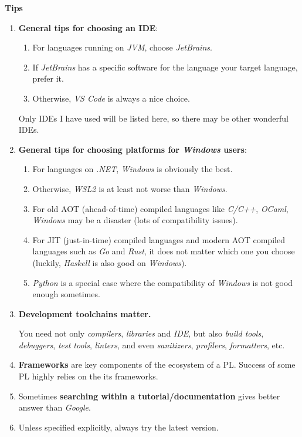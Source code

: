 \documentclass{article}
\begin{document}
\textbf{Tips}
\begin{enumerate}
    \item \textbf{General tips for choosing an IDE}:
    \begin{enumerate}
        \item For languages running on \emph{JVM}, choose \emph{JetBrains}.
        \item If \emph{JetBrains} has a specific software for the language your target language, prefer it.
        \item Otherwise, \emph{VS Code} is always a nice choice.
    \end{enumerate}
        Only IDEs I have used will be listed here, so there may be other wonderful IDEs.
    \item \textbf{General tips for choosing platforms for \emph{Windows} users}:
    \begin{enumerate}
        \item For languages on \emph{.NET}, \emph{Windows} is obviously the best.
        \item Otherwise, \emph{WSL2} is at least not worse than \emph{Windows}.
        \item For old AOT (ahead-of-time) compiled languages like \emph{C/C++}, \emph{OCaml}, \emph{Windows} may be a disaster (lots of compatibility issues).
        \item For JIT (just-in-time) compiled languages and modern AOT compiled languages such as \emph{Go} and \emph{Rust}, it does not matter which one you choose (luckily, \emph{Haskell} is also good on \emph{Windows}).
        \item \emph{Python} is a special case where the compatibility of \emph{Windows} is not good enough sometimes.
    \end{enumerate}
    \item \textbf{Development toolchains matter.}
    
    You need not only \emph{compilers}, \emph{libraries} and \emph{IDE}, but also \emph{build tools}, \emph{debuggers}, \emph{test tools}, \emph{linters}, and even \emph{sanitizers}, \emph{profilers}, \emph{formatters}, etc.
    
    \item \textbf{Frameworks} are key components of the ecosystem of a PL.
    Success of some PL highly relies on the its frameworks.
    \item Sometimes \textbf{searching within a tutorial/documentation} gives better answer than \emph{Google}.
    \item Unless specified explicitly, always try the latest version.
\end{enumerate}
\end{document}
